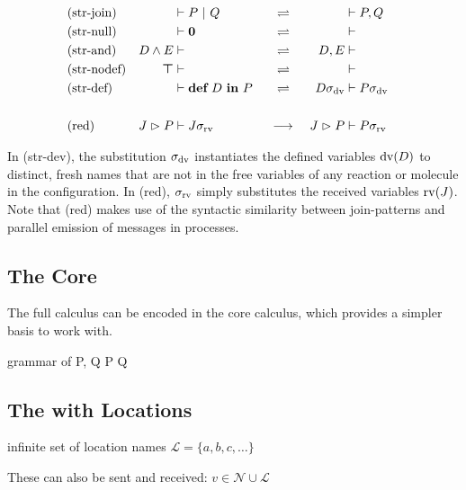 \begin{align*}
  &(\text{str-join}) & 
    &\vdash P \ |\  Q
   & &\ \ \rightleftharpoons &\ 
    &\vdash P, Q
   & &
  \\
  &(\text{str-null}) & 
    &\vdash \textbf{0}
   & &\ \ \rightleftharpoons &\ 
    &\vdash
   & &
  \\
  &(\text{str-and}) & 
    D \wedge E &\vdash
   & &\ \ \rightleftharpoons &\ 
    D, E &\vdash
   & &
  \\
  &(\text{str-nodef}) & 
    \boldsymbol{\top} &\vdash
   & &\ \ \rightleftharpoons &\ 
    &\vdash
   & &
  \\
  &(\text{str-def}) & 
    &\vdash \textbf{def} \ D \ \textbf{in} \ P
   & &\ \ \rightleftharpoons &\ 
    D\sigma_{\operatorname{dv}} &\vdash P\sigma_{\operatorname{dv}}
   & &
  \\
  \\
  &(\text{red}) & 
    J \vartriangleright P &\vdash J\sigma_{\operatorname{rv}}
   & &\ \longrightarrow &\ 
    J \vartriangleright P &\vdash P\sigma_{\operatorname{rv}}
   & &
\end{align*}

In (str-dev), the substitution $\sigma_{\operatorname{dv}}$ instantiates the defined
variables $\operatorname{dv}(D)$ to distinct, fresh names that are not in the free variables
of any reaction or molecule in the configuration.
In (red), $\sigma_{\operatorname{rv}}$ simply substitutes the received variables $\operatorname{rv}(J)$.
Note that (red) makes use of the syntactic similarity between join-patterns
and parallel emission of messages in processes.


\subsection{The Core \JoinCalc}

The full calculus can be encoded in the core calculus,
which provides a simpler basis to work with.

\begin{JDef}{grammar of \monadicjoincalc}
  P, Q
  \grmr {}
  \altn P \jpar Q
  \altn {}
\end{JDef}


\subsection{The \JoinCalc with Locations}

\cite{fournet_calculus_1996}

infinite set of location names
$ \mathcal{L} = \{ a, b, c, \ldots \} $

These can also be sent and received:
$ v \in \mathcal{N} \cup \mathcal{L} $


